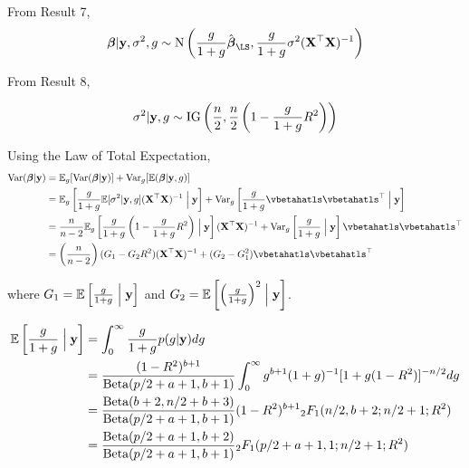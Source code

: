 \documentclass{amsart}[12pt]
\begin{document}
From Result 7,
\[
	\vbeta | \vy, \sigma^2, g \sim \N\left(\frac{g}{1+g} \hat{\vbeta}_{\LS}, \frac{g}{1+g} \sigma^2 (\mX^\top \mX)^{-1}\right)
\]

From Result 8,

\[
	\sigma^2 | {\bf y}, g \sim \text{IG}\left(\frac{n}{2}, \frac{n}{2} \left(1 - \frac{g}{1 + g} R^2\right)\right)
\]


Using the Law of Total Expectation,
\begin{align*}
	\Var(\vbeta | \vy) & = \E_g[\Var(\vbeta | \vy)] + \Var_g[\E(\vbeta|\vy, g)]                                                                                                                                                 \\
	                   & = \E_g\left[\frac{g}{1 + g} \E[\sigma^2|\vy, g] (\mX^\top \mX)^{-1} \Bigm| \vy \right] + \Var_g\left[\frac{g}{1 + g} \vbetahatls \vbetahatls^\top \Bigm| \vy \right]                                   \\
	                   & = \frac{n}{n - 2} \E_g\left[\frac{g}{1 + g} \left(1 - \frac{g}{1 + g} R^2 \right) \Bigm| \vy \right] (\mX^\top \mX)^{-1} + \Var_g\left[\frac{g}{1 + g} \Bigm| \vy \right] \vbetahatls \vbetahatls^\top \\
	                   & = \left( \frac{n}{n - 2} \right) (G_1 - G_2 R^2) (\mX^\top \mX)^{-1} + (G_2 - G_1^2) \vbetahatls \vbetahatls^\top                                                                                      
\end{align*}

where $G_1 = \mathbb{E}\left[\frac{g}{1 + g} \Bigm| {\bf y} \right]$ and $G_2 = \mathbb{E}\left[ \left(\frac{g}{1 + g} \right)^2 \Bigm| {\bf y} \right]$.

\begin{align*}
	\mathbb{E}\left[\frac{g}{1 + g} \Bigm| {\bf y} \right] & = \int_0^\infty \frac{g}{1 + g} p(g | {\bf y}) dg                                                                      \\
	                                           & = \frac{(1 - R^2)^{b+1}}{\text{Beta}(p/2 + a + 1, b + 1)} \int_0^\infty g^{b+1} (1 + g)^{-1} [1 + g (1 - R^2)]^{-n/2} dg \\
	                                           & = \frac{\text{Beta}(b + 2, n/2 + b + 3)}{\text{Beta}(p /2 + a + 1, b + 1)} (1 - R^2)^{b+1} {}_2 F_1(n/2, b + 2; n/2 + 1; R^2)  \\
	                                           & = \frac{\text{Beta}(p/2 + a + 1, b + 2)}{\text{Beta}(p /2 + a + 1, b + 1)} {}_2 F_1(p/2 + a + 1, 1; n/2 + 1; R^2)              
\end{align*}
\end{document}
